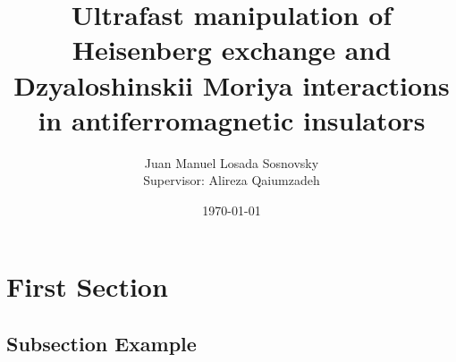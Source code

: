 \documentclass{beamer}
\title[Ultrafast manipulation of antiferromagnetic insulators]{Ultrafast manipulation of Heisenberg exchange and Dzyaloshinskii Moriya interactions in antiferromagnetic insulators} %
\author[Juan Manuel Losada Sosnovsky]{Juan Manuel Losada Sosnovsky\\[10mm]{\small Supervisor: Alireza Qaiumzadeh}}
\institute[NTNU] %
{
QuSpin (NTNU)
}
\date{\today} %
\begin{document}
\begin{frame}
\titlepage %
\end{frame}


\section{First Section} %

\subsection{Subsection Example} %
\end{document}
